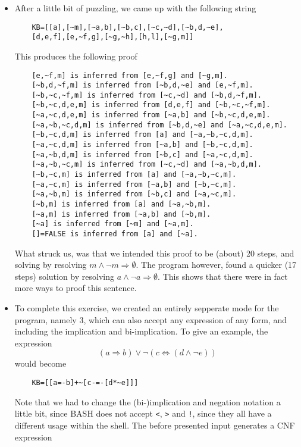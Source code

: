 \documentclass{report}
\begin{document}
\begin{itemize}
    \item After a little bit of puzzling, we came up with the following string\\
    \begin{verbatim}
    KB=[[a],[~m],[~a,b],[~b,c],[~c,~d],[~b,d,~e],
    [d,e,f],[e,~f,g],[~g,~h],[h,l],[~g,m]]
    \end{verbatim}
    This produces the following proof
    \begin{verbatim}
    [e,~f,m] is inferred from [e,~f,g] and [~g,m].
    [~b,d,~f,m] is inferred from [~b,d,~e] and [e,~f,m].
    [~b,~c,~f,m] is inferred from [~c,~d] and [~b,d,~f,m].
    [~b,~c,d,e,m] is inferred from [d,e,f] and [~b,~c,~f,m].
    [~a,~c,d,e,m] is inferred from [~a,b] and [~b,~c,d,e,m].
    [~a,~b,~c,d,m] is inferred from [~b,d,~e] and [~a,~c,d,e,m].
    [~b,~c,d,m] is inferred from [a] and [~a,~b,~c,d,m].
    [~a,~c,d,m] is inferred from [~a,b] and [~b,~c,d,m].
    [~a,~b,d,m] is inferred from [~b,c] and [~a,~c,d,m].
    [~a,~b,~c,m] is inferred from [~c,~d] and [~a,~b,d,m].
    [~b,~c,m] is inferred from [a] and [~a,~b,~c,m].
    [~a,~c,m] is inferred from [~a,b] and [~b,~c,m].
    [~a,~b,m] is inferred from [~b,c] and [~a,~c,m].
    [~b,m] is inferred from [a] and [~a,~b,m].
    [~a,m] is inferred from [~a,b] and [~b,m].
    [~a] is inferred from [~m] and [~a,m].
    []=FALSE is inferred from [a] and [~a].
    \end{verbatim}
    What struck us, was that we intended this proof to be (about) 20 steps, and solving by resolving $m \land \neg m \Rightarrow \emptyset$. The program however, found a quicker (17 steps) solution by resolving $a \land \neg a \Rightarrow \emptyset$. This shows that there were in fact more ways to proof this sentence.
    \item To complete this exercise, we created an entirely sepperate mode for the program, namely 3, which can also accept any expression of any form, and including the implication and bi-implication. To give an example, the expression 
    $$ (a \Rightarrow b) \lor \neg(c \Leftrightarrow (d \land \neg e)) $$
    would become 
    \begin{verbatim}
    KB=[[a=-b]+~[c-=-[d*~e]]]
    \end{verbatim}
    Note that we had to change the (bi-)implication and negation notation a little bit, since BASH does not accept \verb|<|, \verb|>| and \verb|!|, since they all have a different usage within the shell.
    The before presented input generates a CNF expression
    \begin{align*} 

\end{align*}
\end{itemize}
\end{document}
